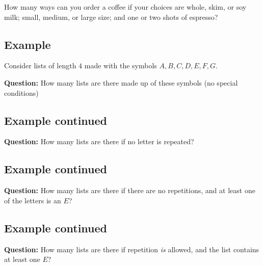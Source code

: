 \documentclass[
]{article}
\begin{document}
How many ways can you order a coffee if your choices are whole, skim, or
soy milk; small, medium, or large size; and one or two shots of
espresso?

\vfill\eject

\hypertarget{example-2}{%
\subsection{Example}\label{example-2}}

Consider lists of length \(4\) made with the symbols \(A,B,C,D,E,F,G\).

\textbf{Question:} How many lists are there made up of these symbols (no
special conditions)

\vfill\eject

\hypertarget{example-continued}{%
\subsection{Example continued}\label{example-continued}}

\textbf{Question:} How many lists are there if no letter is repeated?

\vfill\eject

\hypertarget{example-continued-1}{%
\subsection{Example continued}\label{example-continued-1}}

\textbf{Question:} How many lists are there if there are no repetitions,
and at least one of the letters is an \(E\)?

\vfill\eject

\hypertarget{example-continued-2}{%
\subsection{Example continued}\label{example-continued-2}}

\textbf{Question:} How many lists are there if repetition \emph{is}
allowed, and the list contains at least one \(E\)?
\end{document}
